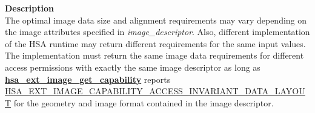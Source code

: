 \documentclass[final,oneside]{book}
\newcommand{\reffun}[1]{\textbf{#1}}
\begin{document}
\vspace{-2mm}\noindent\textbf{Description}\\
The optimal image data size and alignment requirements may vary depending on the image attributes specified in \textit{image_\-descriptor}. Also, different implementation of the HSA runtime may return different requirements for the same input values.\\[2mm]
The implementation must return the same image data requirements for different access permissions with exactly the same image descriptor as long as \hyperlink{group__ext-images_1ga12a909df33851b76afa2850abc7086f1}{\reffun{hsa_\-ext_\-image_\-get_\-capability}} reports \hyperlink{group__ext-images_1ggab3d3401883f796b3f2d8dfad14f90568a7e7df436921a7ef7028281b9c12d6dc2}{HSA_\-EXT_\-IMAGE_\-CAPABILITY_\-ACCESS_\-INVARIANT_\-DATA_\-LAYOUT} for the geometry and image format contained in the image descriptor. 
\end{document}
